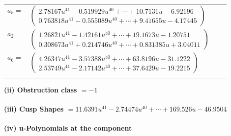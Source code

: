 \documentclass[1p]{elsarticle_modified}
\theoremstyle{definition}
\begin{document}
\begin{tabular}{m{7pt} m{180pt} m{7pt} m{180pt} }
\flushright $a_{5}=$&$\begin{pmatrix}2.78167 u^{41}-0.519929 u^{40}+\cdots+10.7131 u-6.92196\\0.763818 u^{41}-0.555089 u^{40}+\cdots+9.41655 u-4.17445\end{pmatrix}$ \\
\flushright $a_{2}=$&$\begin{pmatrix}1.26821 u^{41}-1.42161 u^{40}+\cdots+19.1673 u-1.20751\\0.308673 u^{41}+0.214746 u^{40}+\cdots+0.831385 u+3.04011\end{pmatrix}$ \\
\flushright $a_{6}=$&$\begin{pmatrix}4.26347 u^{41}-3.57388 u^{40}+\cdots+63.8196 u-31.1222\\2.53749 u^{41}-2.17142 u^{40}+\cdots+37.6429 u-19.2215\end{pmatrix}$\\&\end{tabular}
\flushleft \textbf{(ii) Obstruction class $= -1$}\\~\\
\flushleft \textbf{(iii) Cusp Shapes $= 11.6391 u^{41}-2.74474 u^{40}+\cdots+169.526 u-46.9504$}\\~\\
\newpage\renewcommand{\arraystretch}{1}
\flushleft \textbf{(iv) u-Polynomials at the component}\newline \\
\end{document}
